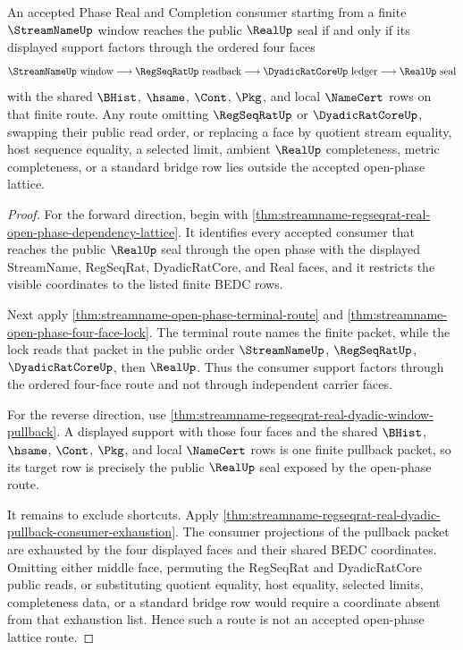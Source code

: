 \begin{theorem}
\label{thm:streamname-open-phase-face-order-no-shortcut}
An accepted Phase Real and Completion consumer starting from a finite $\StreamNameUp$ window reaches the public $\RealUp$ seal if and only if its displayed support factors through the ordered four faces
$$
\StreamNameUp\text{ window}\longrightarrow \RegSeqRatUp\text{ readback}\longrightarrow \DyadicRatCoreUp\text{ ledger}\longrightarrow \RealUp\text{ seal}
$$
with the shared $\BHist$, $\hsame$, $\Cont$, $\Pkg$, and local $\NameCert$ rows on that finite route. Any route omitting $\RegSeqRatUp$ or $\DyadicRatCoreUp$, swapping their public read order, or replacing a face by quotient stream equality, host sequence equality, a selected limit, ambient $\RealUp$ completeness, metric completeness, or a standard bridge row lies outside the accepted open-phase lattice.
\end{theorem}
\begin{proof}
For the forward direction, begin with \autoref{thm:streamname-regseqrat-real-open-phase-dependency-lattice}. It identifies every accepted consumer that reaches the public $\RealUp$ seal through the open phase with the displayed StreamName, RegSeqRat, DyadicRatCore, and Real faces, and it restricts the visible coordinates to the listed finite BEDC rows.

Next apply \autoref{thm:streamname-open-phase-terminal-route} and \autoref{thm:streamname-open-phase-four-face-lock}. The terminal route names the finite packet, while the lock reads that packet in the public order $\StreamNameUp$, $\RegSeqRatUp$, $\DyadicRatCoreUp$, then $\RealUp$. Thus the consumer support factors through the ordered four-face route and not through independent carrier faces.

For the reverse direction, use \autoref{thm:streamname-regseqrat-real-dyadic-window-pullback}. A displayed support with those four faces and the shared $\BHist$, $\hsame$, $\Cont$, $\Pkg$, and local $\NameCert$ rows is one finite pullback packet, so its target row is precisely the public $\RealUp$ seal exposed by the open-phase route.

It remains to exclude shortcuts. Apply \autoref{thm:streamname-regseqrat-real-dyadic-pullback-consumer-exhaustion}. The consumer projections of the pullback packet are exhausted by the four displayed faces and their shared BEDC coordinates. Omitting either middle face, permuting the RegSeqRat and DyadicRatCore public reads, or substituting quotient equality, host equality, selected limits, completeness data, or a standard bridge row would require a coordinate absent from that exhaustion list. Hence such a route is not an accepted open-phase lattice route.
\end{proof}

